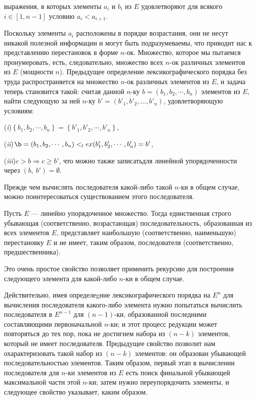 \documentclass{../../template/mai_book}
\begin{document}
{\noindent выражения, в которых элементы $a_i$ и $b_i$ из $E$ удовлетворяют для всякого
 $i \in [1, n - 1]$ условию $a_i < a_{i+1}$.

Поскольку элементы $a_i$ расположены в порядке возрастания, они не
несут никакой полезной информации и могут быть подразумеваемы,
что приводит нас к представлению перестановок в форме $n$-ок.
Множество, которое мы пытаемся пронумеровать, есть, следовательно,
множество всех $n$-ок различных элементов из $E$ (мощности $n$). Предыдущее
определение лексикографического порядка без труда распространяется
на множество $n$-ок различных элементов из $E$, и задача теперь становится
такой: считая данной $n$-ку $b = (b_1,b_2, \cdots ,b_n)$ элементов из $E$, найти следующую
за ней $n$-ку $b' = (b'_1, b'_2,..., b'_n)$, удовлетворяющую условиям:\newline

(\textit{i})$\left\{ b_1,b_2,\cdots, b_n \right\} =\left\{ b'_1,b'_2, \cdots, b'_n\right\}$,

(\textit{ii})$\b = (b_1, b_2, \cdots, b_n) <_lex (b'_1, b'_2, \cdots, b'_n) = b'$,

(\textit{iii})$c > b \Rightarrow c \geq b'$, что можно также записатьдля линейной
упорядоченности через $(b,\: b') = \emptyset$.\newline

Прежде чем вычислять последователя какой-либо такой $n$-ки
 в общем случае, можно поинтересоваться существованием этого последователя.

\begin{property}
\hspace*{15pt}Пусть $E$ — линейно упорядоченное множество. Тогда единственная строго убывающая
(соответственно, возрастающая) последовательность, образованная из всех элементов $E$,
представляет наибольшую (соответственно, наименьшую) перестановку $E$ и не имеет,
таким образом, последователя (соответственно, предшественника).
\end{property}

Это очень простое свойство позволяет применить рекурсию для построения следующего
элемента для какой-либо $n$-ки в общем случае.
\newpage

\noindent Действительно, имея определеgние лексикографического порядка на $E^n$ 
для вычисления последователя какого-либо элемента нужно попытаться 
вычислить последователя в $E^{n-1}$ для $(n - 1)$-ки, образованной  
последними составляющими первоначальной $n$-ки; и этот процесс редукции 
может повторяться до тех пор, пока не достигнем набора из $(n - k)$ 
элементов, который не имеет последователя. Предыдущее свойство  
позволит нам охарактеризовать такой набор из $(n - k)$ элементов: он  
образован убывающей последовательностью элементов. Таким образом,  
первый этап в вычислении последователя для $n$-ки элементов из $E$ есть  
поиск финальной убывающей максимальной части этой $n$-ки; затем  
нужно переупорядочить элементы, и следующее свойство указывает, каким 
образом.

}
\end{document}
